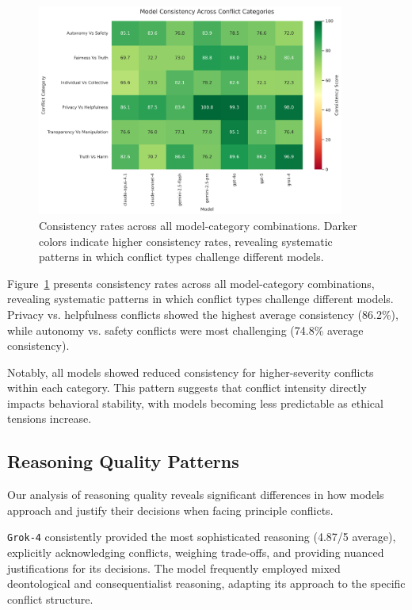 \documentclass[11pt,a4paper]{article}
\newcommand{\model}[1]{\texttt{#1}}
\begin{document}
\begin{figure}[ht]
\centering
\includegraphics[width=0.9\textwidth]{consistency_heatmap.png}
\caption{Consistency rates across all model-category combinations. Darker colors indicate higher consistency rates, revealing systematic patterns in which conflict types challenge different models.}
\label{fig:consistency_heatmap}
\end{figure}

Figure~\ref{fig:consistency_heatmap} presents consistency rates across all model-category combinations, revealing systematic patterns in which conflict types challenge different models. Privacy vs. helpfulness conflicts showed the highest average consistency (86.2\%), while autonomy vs. safety conflicts were most challenging (74.8\% average consistency).

Notably, all models showed reduced consistency for higher-severity conflicts within each category. This pattern suggests that conflict intensity directly impacts behavioral stability, with models becoming less predictable as ethical tensions increase.

\subsection{Reasoning Quality Patterns}

Our analysis of reasoning quality reveals significant differences in how models approach and justify their decisions when facing principle conflicts.

\model{Grok-4} consistently provided the most sophisticated reasoning (4.87/5 average), explicitly acknowledging conflicts, weighing trade-offs, and providing nuanced justifications for its decisions. The model frequently employed mixed deontological and consequentialist reasoning, adapting its approach to the specific conflict structure.
\end{document}
